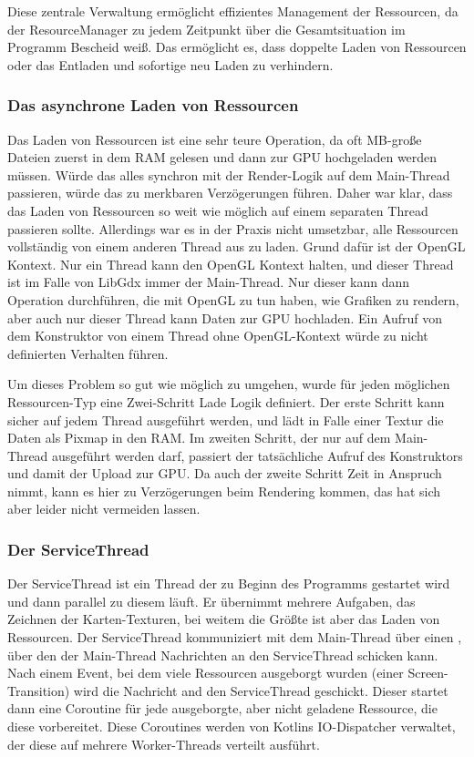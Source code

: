 Diese zentrale Verwaltung ermöglicht effizientes Management der Ressourcen, da der ResourceManager zu jedem Zeitpunkt
über die Gesamtsituation im Programm Bescheid weiß.
Das ermöglicht es, dass doppelte Laden von Ressourcen oder das Entladen und sofortige neu Laden zu verhindern.

\subsubsection{Das asynchrone Laden von Ressourcen}

Das Laden von Ressourcen ist eine sehr teure Operation, da oft MB-große Dateien zuerst in dem RAM gelesen und
dann zur GPU hochgeladen werden müssen.
Würde das alles synchron mit der Render-Logik auf dem Main-Thread passieren, würde das zu merkbaren Verzögerungen
führen.
Daher war klar, dass das Laden von Ressourcen so weit wie möglich auf einem separaten Thread passieren sollte.
Allerdings war es in der Praxis nicht umsetzbar, alle Ressourcen vollständig von einem anderen Thread aus zu laden.
Grund dafür ist der OpenGL Kontext.
Nur ein Thread kann den OpenGL Kontext halten, und dieser Thread ist im Falle von LibGdx immer der Main-Thread.
Nur dieser kann dann Operation durchführen, die mit OpenGL zu tun haben, wie \zB Grafiken zu rendern, aber auch nur
dieser Thread kann Daten zur GPU hochladen.
Ein Aufruf von \zB dem  Konstruktor von einem Thread ohne OpenGL-Kontext würde zu nicht
definierten Verhalten führen.\cite{libGdxThreading}

Um dieses Problem so gut wie möglich zu umgehen, wurde für jeden möglichen Ressourcen-Typ eine Zwei-Schritt Lade Logik
definiert.
Der erste Schritt kann sicher auf jedem Thread ausgeführt werden, und lädt \zB in Falle einer Textur die Daten als
Pixmap in den RAM\@.
Im zweiten Schritt, der nur auf dem Main-Thread ausgeführt werden darf, passiert der tatsächliche Aufruf des
 Konstruktors und damit der Upload zur GPU\@.
Da auch der zweite Schritt Zeit in Anspruch nimmt, kann es hier zu Verzögerungen beim Rendering kommen, das hat sich
aber leider nicht vermeiden lassen.

\subsubsection{Der ServiceThread}

Der ServiceThread ist ein Thread der zu Beginn des Programms gestartet wird und dann parallel zu diesem läuft.
Er übernimmt mehrere Aufgaben, \zB das Zeichnen der Karten-Texturen, bei weitem die Größte ist aber das Laden von
Ressourcen.
Der ServiceThread kommuniziert mit dem Main-Thread über einen , über
den der Main-Thread Nachrichten an den ServiceThread schicken kann.
Nach einem Event, bei dem viele Ressourcen ausgeborgt wurden (\zB einer Screen-Transition) wird die
 Nachricht and den ServiceThread geschickt.
Dieser startet dann eine Coroutine für jede ausgeborgte, aber nicht geladene Ressource, die diese vorbereitet.
Diese Coroutines werden von Kotlins IO-Dispatcher verwaltet, der diese auf mehrere Worker-Threads verteilt ausführt.

